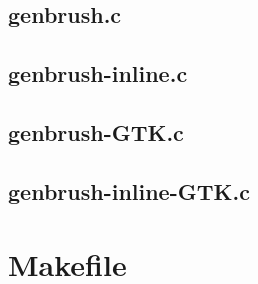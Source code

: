 \subsection{genbrush.c}

\begin{scriptsize}
\begin{ttfamily}

\end{ttfamily}
\end{scriptsize}

\subsection{genbrush-inline.c}

\begin{scriptsize}
\begin{ttfamily}

\end{ttfamily}
\end{scriptsize}

\subsection{genbrush-GTK.c}

\begin{scriptsize}
\begin{ttfamily}

\end{ttfamily}
\end{scriptsize}

\subsection{genbrush-inline-GTK.c}

\begin{scriptsize}
\begin{ttfamily}

\end{ttfamily}
\end{scriptsize}

\section{Makefile}

\begin{scriptsize}
\begin{ttfamily}

\end{ttfamily}
\end{scriptsize}

